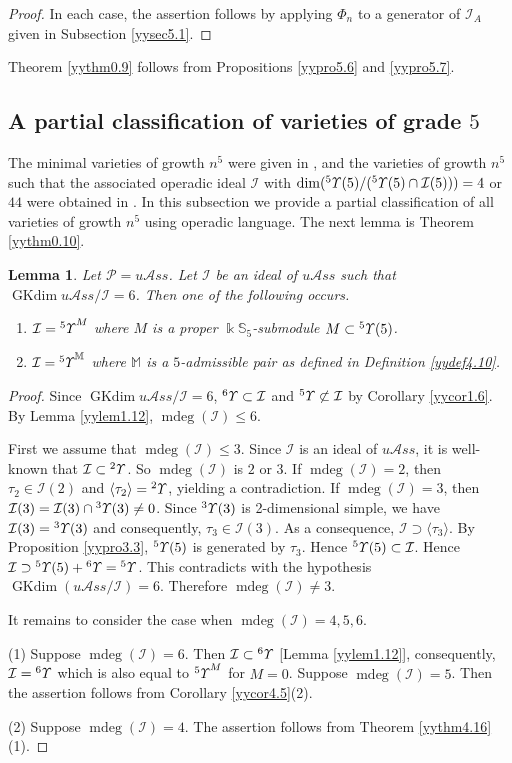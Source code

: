\documentclass{amsart}
\newtheorem{lem}[thm]{Lemma}
\theoremstyle{definition}
\theoremstyle{remark}
\numberwithin{equation}{section}
\def\S{\mathbb{S}}
\def\mdeg{\operatorname{mdeg}}
\newcommand{\lr}[1]{\langle #1 \rangle}
\newcommand{\up}[1]{{^{#1}{\it \!\Upsilon}}}
\newcommand{\upa}[1]{{^{#1}{\it \!\Upsilon}}}
\def \uas{u\mathcal{A}ss}
\def \I{\mathcal{I}}
\def \ip{{\mathcal{P}}}
\def \dim{\operatorname{dim}}
\def\gkdim{\operatorname{GKdim}}
\def \S{\mathbb{S}}
\begin{document}
\begin{proof}
In each case, the assertion follows by applying $\Phi_n$ to
a generator of $\I_A$ given in Subsection \ref{yysec5.1}.
\end{proof}

Theorem \ref{yythm0.9} follows from Propositions 
\ref{yypro5.6} and \ref{yypro5.7}.

\subsection{A partial classification of varieties of grade $5$}
\label{yysec5.3}

The minimal varieties of growth $n^5$ were given in \cite[Section 5]{GMZ}, 
and the varieties of growth $n^5$ such that the associated operadic 
ideal $\I$ with $\dim(\up{5}(5)/(\up{5}(5)\cap \I(5)))=4$ or $44$ were 
obtained in \cite{OV}. In this subsection we provide a partial 
classification of all varieties of growth $n^5$ using operadic 
language. The next lemma is Theorem \ref{yythm0.10}.


\begin{lem}
\label{yylem5.8}
Let $\ip=\uas$. Let $\I$ be an ideal of $\uas$ such that 
$\gkdim \uas/\I=6$. Then one of the following occurs.
\begin{enumerate}
\item[(1)]
$\I=\up{5}^M$ where $M$ is a proper $\Bbbk \S_5$-submodule 
$M\subset \up{5}(5)$.
\item[(2)]
$\I=\upa{5}^{\mathbb M}$ where ${\mathbb M}$ is a $5$-admissible 
pair as defined in Definition {\rm{\ref{yydef4.10}}}.
\end{enumerate}
\end{lem}

\begin{proof} Since $\gkdim \uas/\I=6$, 
$\up{6}\subset \I$ and $\up{5}\not \subset 
\I$ by Corollary \ref{yycor1.6}. By 
Lemma \ref{yylem1.12}, $\mdeg(\I)\leq 6$. 

First we assume that $\mdeg(\I)\leq 3$. Since $\I$ is an 
ideal of $\uas$, it is well-known that $\I\subset \up{2}$.
So $\mdeg(\I)$ is $2$ or $3$. If $\mdeg(\I)=2$, then 
$\tau_{2}\in \I(2)$ and $\lr{\tau_2}=\up{2}$, yielding 
a contradiction. If $\mdeg(\I)=3$, then $\I(3)=\I(3)
\cap \up{3}(3)\neq 0$. Since $\up{3}(3)$ is 
2-dimensional simple, we have $\I(3)=\up{3}(3)$ and
consequently, $\tau_3\in \I(3)$. As a consequence,
$\I\supset \lr{\tau_3}$. By Proposition 
\ref{yypro3.3}, $\up{5}(5)$ is generated by $\tau_3$.
Hence $\up{5}(5)\subset \I$. Hence $\I\supset
\up{5}(5)+\up{6}=\up{5}$. This contradicts with
the hypothesis $\gkdim (\uas/\I)=6$. Therefore $\mdeg(\I)
\neq 3$.

It remains to consider the case when $\mdeg(\I)=4,5,6$.


(1) Suppose $\mdeg(\I)=6$. Then $\I\subset \up{6}$
[Lemma \ref{yylem1.12}], consequently, $\I=\up{6}$
which is also equal to $\up{5}^M$ for $M=0$.
Suppose $\mdeg(\I)=5$. Then the assertion follows from 
Corollary \ref{yycor4.5}(2).

(2) Suppose $\mdeg(\I)=4$. The assertion follows from 
Theorem \ref{yythm4.16}(1).
\end{proof}
\end{document}
